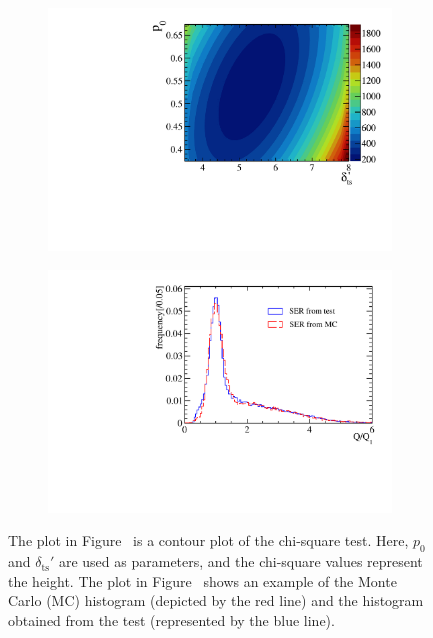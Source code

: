 \begin{figure}[!htbp]
	\centering
	\begin{subfigure}{0.5\textwidth}
		\centering
		\includegraphics[width=0.95\linewidth]{PMTRelated/GTmodel/cour.pdf}
		\caption{}
		\label{fig:cour}
	\end{subfigure}%
	\hfill
	\begin{subfigure}{0.5\textwidth}
		\centering
		\includegraphics[width=0.95\linewidth]{PMTRelated/GTmodel/hist.pdf}
		\caption{}
		\label{fig:hist}
	\end{subfigure}
	\caption{The plot in Figure~ is a contour plot of the chi-square test. Here, $p_0$ and $\delta_{\mathrm{ts}}'$ are used as parameters, and the chi-square values represent the height. The plot in Figure~ shows an example of the Monte Carlo (MC) histogram (depicted by the red line) and the histogram obtained from the test (represented by the blue line).
	}
	\label{fig:chi}
\end{figure}

